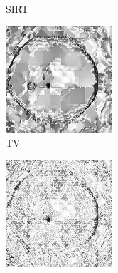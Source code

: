 \documentclass[journal]{IEEEtran}
\begin{document}
\begin{figure}[!h]
\begin{subfigure}[b]{0.24\linewidth}
        \caption{SIRT}
    \end{subfigure}
        \begin{subfigure}[b]{0.24\linewidth}
        \includegraphics[width=\textwidth]{../images/potato/post_tci/comparison/weightsIm_tv30.png}
        \caption{TV}
     \end{subfigure}
    \begin{subfigure}[b]{0.24\linewidth}
        \includegraphics[width=\textwidth]{../images/potato/post_tci/comparison/weightsIm_all_methods30.png}

\end{subfigure}
\end{figure}
\end{document}
